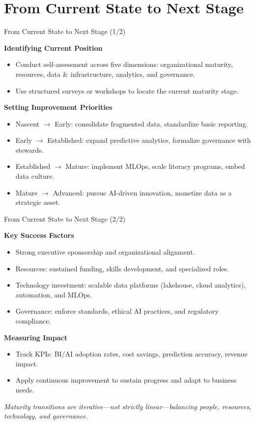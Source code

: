 \documentclass[aspectratio=169, table]{beamer}
\begin{document}
\section{From Current State to Next Stage}

\begin{frame}{From Current State to Next Stage (1/2)}
	\vspace{20pt}
	
	\textbf{Identifying Current Position}
	\begin{itemize}
		\item Conduct self-assessment across five dimensions: organizational maturity, resources, data \& infrastructure, analytics, and governance.
		\item Use structured surveys or workshops to locate the current maturity stage.
	\end{itemize}
	
	\textbf{Setting Improvement Priorities}
	\begin{itemize}
		\item Nascent $\rightarrow$ Early: consolidate fragmented data, standardize basic reporting.  
		\item Early $\rightarrow$ Established: expand predictive analytics, formalize governance with stewards.  
		\item Established $\rightarrow$ Mature: implement MLOps, scale literacy programs, embed data culture.  
		\item Mature $\rightarrow$ Advanced: pursue AI-driven innovation, monetize data as a strategic asset.  
	\end{itemize}
\end{frame}

\begin{frame}{From Current State to Next Stage (2/2)}
	\vspace{20pt}
	
	\textbf{Key Success Factors}
	\begin{itemize}
		\item Strong executive sponsorship and organizational alignment.  
		\item Resources: sustained funding, skills development, and specialized roles.  
		\item Technology investment: scalable data platforms (lakehouse, cloud analytics), automation, and MLOps.  
		\item Governance: enforce standards, ethical AI practices, and regulatory compliance.  
	\end{itemize}
	
	\textbf{Measuring Impact}
	\begin{itemize}
		\item Track KPIs: BI/AI adoption rates, cost savings, prediction accuracy, revenue impact.  
		\item Apply continuous improvement to sustain progress and adapt to business needs.  
	\end{itemize}
	
	\textit{Maturity transitions are iterative—not strictly linear—balancing people, resources, technology, and governance.}
\end{frame}
\end{document}
